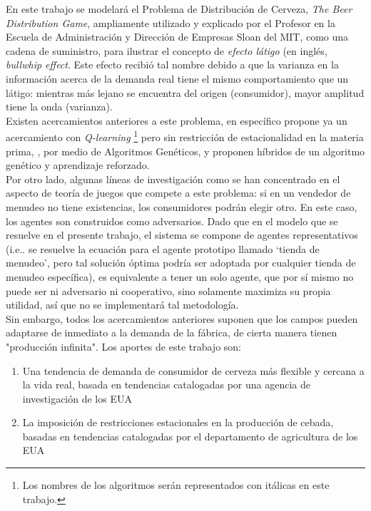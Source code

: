 En este trabajo se modelará el Problema de Distribución de Cerveza, \textit{The Beer Distribution Game}, ampliamente utilizado y explicado por el Profesor \citet{Sterman} en la Escuela de Administraci\'on y Direcci\'on de Empresas Sloan del MIT, como una cadena de suministro, para ilustrar el concepto de \textit{efecto l\'atigo} (en ingl\'es, \textit{bullwhip effect}. Este efecto recibi\'o tal nombre debido a que la varianza en la informaci\'on acerca de la demanda real tiene el mismo comportamiento que un l\'atigo: mientras m\'as lejano se encuentra del origen (consumidor), mayor amplitud tiene la onda (varianza).\\

Existen acercamientos anteriores a este problema, en espec\'ifico \citet{Chaharsooghi} propone ya un acercamiento con \textit{Q-learning} \footnote{Los nombres de los algoritmos ser\'an representados con it\'alicas en este trabajo.} pero sin restricci\'on de estacionalidad en la materia prima, \citet{Strozzi}, por medio de Algoritmos Genéticos, \citet{Kimbrough} y \citet{Zarandi} proponen h\'ibridos de un algoritmo gen\'etico y aprendizaje reforzado.\\

Por otro lado, algunas l\'ineas de investigaci\'on como \citet{Busoniu} se han concentrado en el aspecto de teor\'ia de juegos que compete a este problema: si en un vendedor de menudeo no tiene existencias, los consumidores podr\'an elegir otro. En este caso, los agentes son construidos como adversarios. Dado que en el modelo que se resuelve en el presente trabajo, el sistema se compone de agentes representativos (i.e.. se resuelve la ecuaci\'on para el agente prototipo llamado `tienda de menudeo', pero tal soluci\'on \'optima podr\'ia ser adoptada por cualquier tienda de menudeo espec\'ifica), es equivalente a tener un solo agente, que por s\'i mismo no puede ser ni adversario ni cooperativo, sino solamente maximiza su propia utilidad, as\'i que no se implementar\'a tal metodolog\'ia.\\

Sin embargo, todos los acercamientos anteriores suponen que los campos pueden adaptarse de inmediato a la demanda de la f\'abrica, de cierta manera tienen "producci\'on infinita". Los aportes de este trabajo son:

\begin{enumerate}
    \item Una tendencia de demanda de consumidor de cerveza m\'as flexible y cercana a la vida real, basada en tendencias catalogadas por una agencia de investigaci\'on de los EUA
    \item La imposici\'on de restricciones estacionales en la producci\'on de cebada, basadas en tendencias catalogadas por el departamento de agricultura de los EUA
\end{enumerate}

